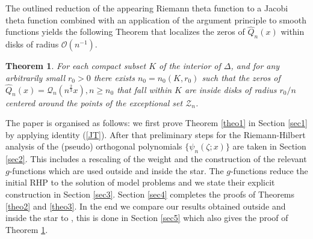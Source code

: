 \documentclass[10pt,oneside,reqno]{amsart}
\numberwithin{equation}{section}
\newtheorem{theorem}{Theorem}[section]
\def\bth{\begin{theorem}}
\def\et{\end{theorem}}
\def\wh{\widehat}
\def\eqref#1{(\ref{#1})}
\begin{document}
The outlined reduction of the appearing Riemann theta function to a Jacobi theta function combined with an application of the argument principle to smooth functions yields the following Theorem that localizes the zeros of $\wh Q_n(x)$ within disks of radius $\mathcal O(n^{-1})$.
\bth\label{theo4} 
For each compact subset  $K$ of the interior of $\Delta$, and for any arbitrarily small $r_0>0$ there exists $n_0= n_0(K, r_0)$  such that the zeros of  $ \wh Q_n(x) = \mathcal{Q}_n(n^{\frac{2}{3}}x),n\geq n_0$ that fall within $K$ are inside disks of radius $r_0/n$ centered around the points of the exceptional set $\mathcal Z_n$.
\et
The paper is organised as follows: we first prove Theorem \ref{theo1} in Section \ref{sec1} by applying identity \eqref{JT}. After that preliminary steps for the 
Riemann-Hilbert analysis of the (pseudo) orthogonal polynomials $\{\psi_n(\zeta;x)\}$ are taken in Section \ref{sec2}. This includes a rescaling of the weight and the construction of the relevant $g$-functions which are used outside and inside the star. The $g$-functions reduce the initial RHP to the solution of model problems and we state their explicit construction in Section \ref{sec3}. Section \ref{sec4} completes the proofs of Theorems \ref{theo2} and \ref{theo3}. In the end we compare our results obtained outside and inside the star to \cite{BM}, this is done in Section \ref{sec5} which also gives the proof of Theorem \ref{theo4}.

	

\end{document}
